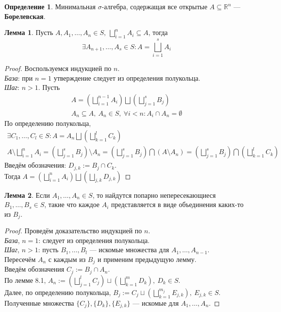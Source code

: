 \documentclass[11pt,a4paper]{report}
\def\Real{\mathbb{R}}
\theoremstyle{definition}
\theoremstyle{definition}
\newtheorem{lemma}{Лемма}[section]
\theoremstyle{definition}
\newtheorem{definition}{Определение}[section]
\begin{document}
	\begin{definition}
		Минимальная $ \sigma $-алгебра, содержащая все открытые $ A \subseteq \Real^{n} $ — \textbf{Борелевская}.
	\end{definition}
	\begin{lemma}
		Пусть $ A, A_{1}, \dots, A_{n} \in S,\ \bigsqcup_{i=1}^{n}{A_{i}} \subseteq A $, тогда 
		\[ \exists A_{n+1}, \dots, A_{s} \in S: A = \bigsqcup_{i=1}^{s}{A_{i}} \]
	\end{lemma}
	\begin{proof}
		Воспользуемся индукцией по $ n $.\\
		\textit{База}: при $ n = 1 $ утверждение следует из определения полукольца.\\
		\textit{Шаг}: $ n > 1 $. Пусть 
		\begin{gather*} 
			A = \left (\bigsqcup_{i=1}^{n-1}{A_{i}}\right ) \bigsqcup \left (\bigsqcup_{j=1}^{s}{B_{j}}\right )\\
			A_{n} \subseteq A,\ A_{n} \in S,\ \forall i < n: A_{i} \cap A_{n} = \emptyset
		\end{gather*}
		По определению полукольца,
		\begin{gather*}
			\exists C_{1}, \dots, C_{l} \in S: A = A_{n} \bigsqcup \left (\bigsqcup_{k=1}^{l}{C_{k}}\right )\\
			A \setminus \bigsqcup_{i=1}^{n}{A_{i}} = \left (\bigsqcup_{j=1}^{s}{B_{j}}\right ) \setminus A_{n} = \left (\bigsqcup_{j=1}^{s}{B_{j}}\right ) \bigcap \left (A \setminus A_{n}\right ) = \left (\bigsqcup_{j=1}^{s}{B_{j}}\right ) \bigcap  \left (\bigsqcup_{k=1}^{l}{C_{k}}\right )
		\end{gather*}
		Введём обозначения: $ D_{j, k} := B_{j} \cap C_{k} $.\\
		Тогда $ A = \left (\bigsqcup\limits_{i=1}^{n}{A_{i}}\right ) \bigsqcup \left (\bigsqcup\limits_{j, k} D_{j, k}\right ) $
	\end{proof}
	\begin{lemma}
		Если $ A_{1}, \dots, A_{n} \in S $, то найдутся попарно непересекающиеся $ B_{1}, \dots, B_{s} \in S $, такие что каждое $ A_{i} $ представляется в виде объединения каких-то из $ B_{j} $.
	\end{lemma}
	\begin{proof}
		Проведём доказательство индукцией по $ n $.\\
		\textit{База}, $ n = 1 $: следует из определения полукольца.\\
		\textit{Шаг}, $ n > 1 $: пусть $ B_{1}, \dots, B_{l} $ — искомые множества для $ A_{1}, \dots, A_{n-1} $.\\
		Пересечём $ A_{n} $ с каждым из $ B_{j} $ и применим предыдущую лемму.\\
		Введём обозначения $ C_{j} := B_{j} \cap A_{n} $.\\
		По лемме 8.1, $ A_{n} := (\bigsqcup_{j=1}^{l} C_{j}) \sqcup (\bigsqcup_{k=1}^{m} D_{k}),\ D_{k} \in S $.\\ 
		Далее, по определению полукольца, $ B_{j} := C_{j} \sqcup (\bigsqcup_{k=1}^{m_{j}}{E_{j, k}}),\ E_{j, k} \in S $.\\
		Полученные множества $ \{C_{j}\}, \{D_{k}\}, \{E_{j, k}\} $ — искомые для $ A_{1}, \dots, A_{n} $.
	\end{proof}
\end{document}
